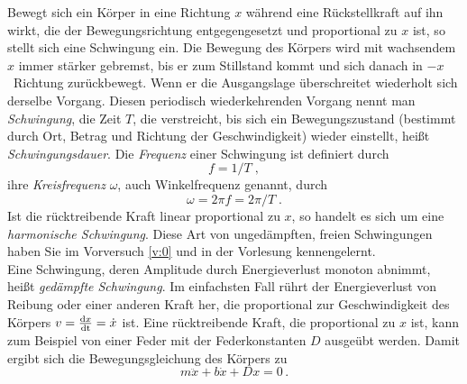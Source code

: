 Bewegt sich ein Körper in eine Richtung $x$ während eine Rückstellkraft auf ihn wirkt, die der Bewegungsrichtung entgegengesetzt und proportional zu $x$ ist, so stellt sich eine Schwingung ein. Die Bewegung des  Körpers wird mit wachsendem $x$ immer stärker gebremst, bis er zum Stillstand kommt und sich danach in $-x$~Richtung zurückbewegt. Wenn er die Ausgangslage überschreitet wiederholt sich derselbe Vorgang. Diesen periodisch wiederkehrenden Vorgang nennt man \textit{Schwingung}, die Zeit $T$, die verstreicht, bis sich ein Bewegungszustand (bestimmt durch Ort, Betrag und Richtung der Geschwindigkeit) wieder einstellt, heißt \textit{Schwingungsdauer}. Die \textit{Frequenz} einer Schwingung ist definiert durch
\begin{equation}
f = 1/T \; ,
\end{equation}
ihre \textit{Kreisfrequenz} $\omega$, auch Winkelfrequenz genannt, durch
\begin{equation}
\omega = 2\pi f = 2\pi /T\; .
\end{equation}
%
Ist die rücktreibende Kraft linear proportional zu $x$, so handelt es sich um eine \textit{harmonische Schwingung}. Diese Art von ungedämpften, freien Schwingungen haben Sie im Vorversuch \ref{v:0} und in der Vorlesung kennengelernt.\\
Eine Schwingung, deren Amplitude durch Energieverlust monoton abnimmt, heißt \textit{gedämpfte Schwingung}. Im einfachsten Fall rührt der Energieverlust von Reibung oder einer anderen Kraft her, die proportional zur Geschwindigkeit des Körpers $v = \frac{{\rm d} x}{\rm dt} = \dot{x}$ ist. Eine rücktreibende Kraft, die proportional zu $x$ ist, kann zum Beispiel von einer Feder mit der Federkonstanten $D$ ausgeübt werden. Damit ergibt sich die Bewegungsgleichung des Körpers zu
\begin{equation}
	m\ddot{x} + b\dot{x} + Dx = 0 \, .
\label{eq:Schwingungsgleichung_vn1}
\end{equation}


